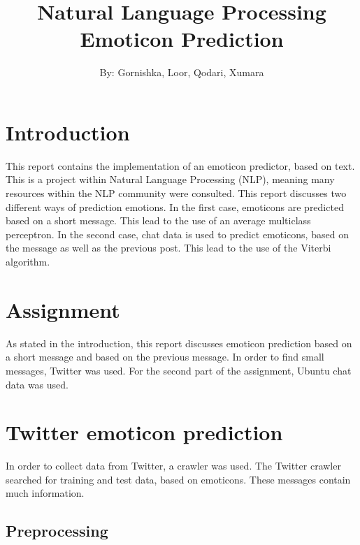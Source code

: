 \documentclass{article}
\begin{document}
\title{Natural Language Processing \\ Emoticon Prediction}

\author{By: Gornishka, Loor, Qodari, Xumara}
\maketitle


\tableofcontents

\pagebreak

\section*{Introduction}

This report contains the implementation of an emoticon predictor, based on text. This is a project within Natural Language Processing (NLP), meaning many resources within the NLP community were consulted. This report discusses two different ways of prediction emotions. In the first case, emoticons are predicted based on a short message. This lead to the use of an average multiclass perceptron. In the second case, chat data is used to predict emoticons, based on the message as well as the previous post. This lead to the use of the Viterbi algorithm.

\section*{Assignment}

As stated in the introduction, this report discusses emoticon prediction based on a short message and based on the previous message. In order to find small messages, Twitter was used. For the second part of the assignment, Ubuntu chat data was used.


\section*{Twitter emoticon prediction}


In order to collect data from Twitter, a crawler was used. The Twitter crawler searched for training and test data, based on emoticons. These messages contain much information. 


\subsection*{Preprocessing}
\end{document}
